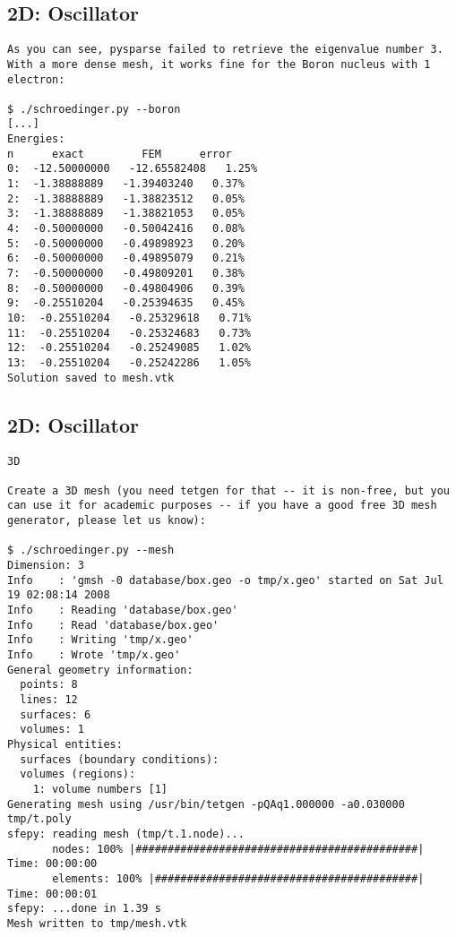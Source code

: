 \subsection{2D: Oscillator}

\begin{lstlisting}
As you can see, pysparse failed to retrieve the eigenvalue number 3. With a more dense mesh, it works fine for the Boron nucleus with 1 electron:

$ ./schroedinger.py --boron
[...]
Energies:
n      exact         FEM      error
0:  -12.50000000   -12.65582408   1.25%
1:  -1.38888889   -1.39403240   0.37%
2:  -1.38888889   -1.38823512   0.05%
3:  -1.38888889   -1.38821053   0.05%
4:  -0.50000000   -0.50042416   0.08%
5:  -0.50000000   -0.49898923   0.20%
6:  -0.50000000   -0.49895079   0.21%
7:  -0.50000000   -0.49809201   0.38%
8:  -0.50000000   -0.49804906   0.39%
9:  -0.25510204   -0.25394635   0.45%
10:  -0.25510204   -0.25329618   0.71%
11:  -0.25510204   -0.25324683   0.73%
12:  -0.25510204   -0.25249085   1.02%
13:  -0.25510204   -0.25242286   1.05%
Solution saved to mesh.vtk

\end{lstlisting}

\subsection{2D: Oscillator}

\begin{lstlisting}
3D

Create a 3D mesh (you need tetgen for that -- it is non-free, but you can use it for academic purposes -- if you have a good free 3D mesh generator, please let us know):

$ ./schroedinger.py --mesh
Dimension: 3
Info    : 'gmsh -0 database/box.geo -o tmp/x.geo' started on Sat Jul 19 02:08:14 2008
Info    : Reading 'database/box.geo'
Info    : Read 'database/box.geo'
Info    : Writing 'tmp/x.geo'
Info    : Wrote 'tmp/x.geo'
General geometry information:
  points: 8
  lines: 12
  surfaces: 6
  volumes: 1
Physical entities:
  surfaces (boundary conditions):
  volumes (regions):
    1: volume numbers [1]
Generating mesh using /usr/bin/tetgen -pQAq1.000000 -a0.030000 tmp/t.poly
sfepy: reading mesh (tmp/t.1.node)...
       nodes: 100% |############################################| Time: 00:00:00
       elements: 100% |#########################################| Time: 00:00:01
sfepy: ...done in 1.39 s
Mesh written to tmp/mesh.vtk

\end{lstlisting}

